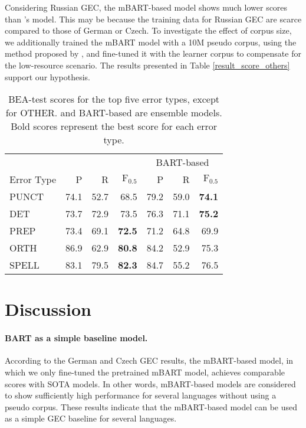 \documentclass[11pt,a4paper]{article}
\begin{document}
Considering Russian GEC, the mBART-based model shows much lower scores than \citet{low_resource_gec}'s model.
This may be because the training data for
 Russian GEC are scarce compared to those of German or Czech.
To investigate the effect of corpus size, we additionally trained the mBART model with a 10M pseudo corpus, using the method proposed by \citet{beasota}, and fine-tuned it with the learner corpus to compensate for the low-resource scenario.
The results presented in Table \ref{result_score_others} support our hypothesis.

\begin{table}[t]
    \centering
    \small
    \begin{tabular}{lrrrrrr} \toprule
          & \multicolumn{3}{c}{\citet{kaneko_bert}} &
          \multicolumn{3}{c}{BART-based} \\ \cmidrule(lr){2-4} \cmidrule(lr){5-7}
        Error Type   & P & R & $\mathrm{F_{0.5}}$ & P & R & $\mathrm{F_{0.5}}$ \\ \midrule
        PUNCT & 74.1 & 52.7 & 68.5 & 79.2 & 59.0 & \textbf{74.1} \\
        DET & 73.7 & 72.9 & 73.5 & 76.3 & 71.1 & \textbf{75.2} \\
        PREP & 73.4 & 69.1 & \textbf{72.5} & 71.2 & 64.8 & 69.9 \\
        ORTH & 86.9 & 62.9 & \textbf{80.8} & 84.2 & 52.9 & 75.3 \\
        SPELL & 83.1 & 79.5 & \textbf{82.3} & 84.7 & 55.2 & 76.5 \\ \bottomrule
    \end{tabular}
    \caption{BEA-test scores for the top five error types, except for OTHER. \citet{kaneko_bert} and BART-based are ensemble models. Bold scores represent the best score for each error type.}
    \label{analysis_bart}
\end{table}

\section{Discussion}
\paragraph{BART as a simple baseline model.}
According to the German and Czech GEC results, the mBART-based model, in which we only fine-tuned the pretrained mBART model, achieves comparable scores with SOTA models.
In other words, mBART-based models are considered to show sufficiently high performance for several languages without using a pseudo corpus.
These results indicate that the mBART-based model can be used as a simple GEC baseline for several languages.
\end{document}
